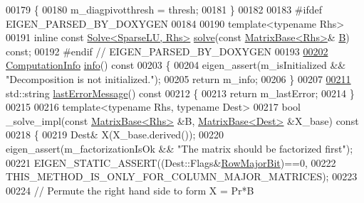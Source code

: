 \begin{DoxyCode}
00179     \{
00180       m\_diagpivotthresh = thresh; 
00181     \}
00182 
00183 \textcolor{preprocessor}{#ifdef EIGEN\_PARSED\_BY\_DOXYGEN}
00184 
00190     \textcolor{keyword}{template}<\textcolor{keyword}{typename} Rhs>
00191     \textcolor{keyword}{inline} \textcolor{keyword}{const} \hyperlink{group___core___module_class_eigen_1_1_solve}{Solve<SparseLU, Rhs>} \hyperlink{group___sparse_core___module_a4a66e9498b06e3ec4ec36f06b26d4e8f}{solve}(\textcolor{keyword}{const} 
      \hyperlink{group___core___module_class_eigen_1_1_matrix_base}{MatrixBase<Rhs>}& \hyperlink{group___core___module_class_eigen_1_1_matrix}{B}) \textcolor{keyword}{const};
00192 \textcolor{preprocessor}{#endif // EIGEN\_PARSED\_BY\_DOXYGEN}
00193     
\hyperlink{group___sparse_l_u___module_ab0d0c1744ffd5a1dff578a44bcef2a3d}{00202}     \hyperlink{group__enums_ga85fad7b87587764e5cf6b513a9e0ee5e}{ComputationInfo} \hyperlink{group___sparse_l_u___module_ab0d0c1744ffd5a1dff578a44bcef2a3d}{info}()\textcolor{keyword}{ const}
00203 \textcolor{keyword}{    }\{
00204       eigen\_assert(m\_isInitialized && \textcolor{stringliteral}{"Decomposition is not initialized."});
00205       \textcolor{keywordflow}{return} m\_info;
00206     \}
00207     
\hyperlink{group___sparse_l_u___module_a5458c4e851d7d75c8ca92c4fd02d2adb}{00211}     std::string \hyperlink{group___sparse_l_u___module_a5458c4e851d7d75c8ca92c4fd02d2adb}{lastErrorMessage}()\textcolor{keyword}{ const}
00212 \textcolor{keyword}{    }\{
00213       \textcolor{keywordflow}{return} m\_lastError; 
00214     \}
00215 
00216     \textcolor{keyword}{template}<\textcolor{keyword}{typename} Rhs, \textcolor{keyword}{typename} Dest>
00217     \textcolor{keywordtype}{bool} \_solve\_impl(\textcolor{keyword}{const} \hyperlink{group___core___module_class_eigen_1_1_matrix_base}{MatrixBase<Rhs>} &B, \hyperlink{group___core___module_class_eigen_1_1_matrix_base}{MatrixBase<Dest>} &X\_base)\textcolor{keyword}{
       const}
00218 \textcolor{keyword}{    }\{
00219       Dest& X(X\_base.derived());
00220       eigen\_assert(m\_factorizationIsOk && \textcolor{stringliteral}{"The matrix should be factorized first"});
00221       EIGEN\_STATIC\_ASSERT((Dest::Flags&\hyperlink{group__flags_gae4f56c2a60bbe4bd2e44c5b19cbe8762}{RowMajorBit})==0,
00222                         THIS\_METHOD\_IS\_ONLY\_FOR\_COLUMN\_MAJOR\_MATRICES);
00223       
00224       \textcolor{comment}{// Permute the right hand side to form X = Pr*B}

\end{DoxyCode}
